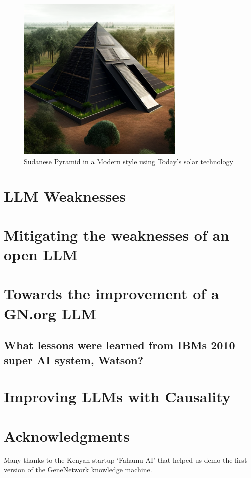 \documentclass[letterpaper]{article}
\begin{document}
\begin{figure}[ht]
\includegraphics[width=8cm]{imgs/Sudanese_Solar_Pyramid.eps}
\caption{Sudanese Pyramid in a Modern style using Today's solar technology}
\end{figure}

\section{LLM Weaknesses}

\section{Mitigating the weaknesses of an open LLM}

\section{Towards the improvement of a GN.org LLM}
\subsection{What lessons were learned from IBMs 2010 super AI system, Watson?}
\section{Improving LLMs with Causality} %

\section{ Acknowledgments}
Many thanks to the Kenyan startup `Fahamu AI' that helped us demo the first version of the GeneNetwork knowledge machine.


\begin{small}


\end{small}
\end{document}
